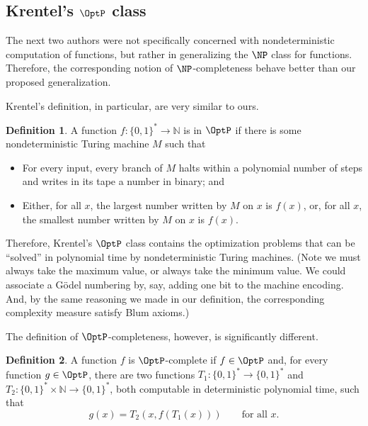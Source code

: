 \documentclass[12pt]{article}
\theoremstyle{definition}
\newtheorem{definition}{Definition}
\begin{document}
\subsection{Krentel's $\OptP$ class}
\label{sec:krentel}

The next two authors were not specifically concerned
with nondeterministic computation of functions,
but rather in generalizing the $\NP$ class for functions.
Therefore, the corresponding notion of $\NP$-completeness
behave better than our proposed generalization.

Krentel's definition, in particular,
are very similar to ours.

\begin{definition}
    A function $f: \{0, 1\}^* \to \mathbb N$ is in $\OptP$
    if there is some nondeterministic Turing machine $M$ such that
    \cite[p.~493]{Krentel1988}
    \begin{itemize}
        \item For every input,
            every branch of $M$ halts within a polynomial number of steps
            and writes in its tape a number in binary; and
        \item Either,
            for all $x$, the largest number written by $M$ on $x$ is $f(x)$,
            or, for all $x$, the smallest number written by $M$ on $x$ is $f(x)$.
    \end{itemize}
\end{definition}

Therefore, Krentel's $\OptP$ class contains the optimization problems
that can be ``solved'' in polynomial time by nondeterministic Turing machines.
(Note we must always take the maximum value, or always take the minimum value.
We could associate a Gödel numbering by, say,
adding one bit to the machine encoding.
And, by the same reasoning we made in our definition,
the corresponding complexity measure satisfy Blum axioms.)

The definition of $\OptP$-completeness, however,
is significantly different.

\begin{definition}
    A function $f$ is $\OptP$-complete if $f \in \OptP$ and,
    for every function $g \in \OptP$,
    there are two functions $T_1 : \{0, 1\}^* \to \{0, 1\}^*$
    and $T_2 : \{0, 1\}^* \times \mathbb N \to \{0, 1\}^*$,
    both computable in deterministic polynomial time,
    such that
    \begin{equation*}
        g(x) = T_2( x, f(T_1(x)) ) \qquad \text{for all $x$.}
    \end{equation*}
\end{definition}
\end{document}
